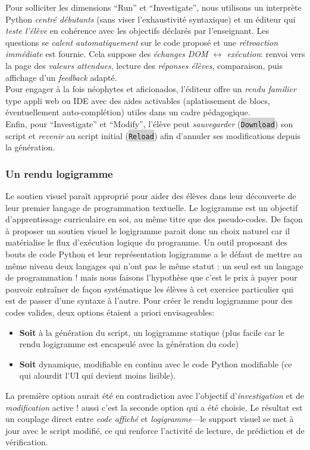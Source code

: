 \documentclass[11pt,a4paper]{article}
\newcommand{\code}[1]{\colorbox{lightgray}{\texttt{\small #1}}}
\begin{document}
Pour solliciter les dimensions ``Run'' et ``Investigate'', nous utilisons un interprète Python \emph{centré débutants} (sans viser l’exhaustivité syntaxique) et un éditeur qui \emph{teste l’élève} en cohérence avec les objectifs déclarés par l’enseignant. Les questions se \emph{calent automatiquement} sur le code proposé et une \emph{rétroaction immédiate} est fournie. Cela suppose des \emph{échanges DOM $\leftrightarrow$ exécution}: renvoi vers la page des \emph{valeurs attendues}, lecture des \emph{réponses élèves}, comparaison, puis affichage d’un \emph{feedback} adapté.
\\
Pour engager à la fois néophytes et aficionados, l’éditeur offre un \emph{rendu familier} type appli web ou IDE avec des aides activables (aplatissement de blocs, éventuellement auto-complétion) utiles dans un cadre pédagogique.\\ Enfin, pour ``Investigate'' et ``Modify'', l’élève peut \emph{sauvegarder} (\code{Download}) son script et \emph{revenir} au script initial (\code{Reload}) afin d’annuler ses modifications depuis la génération.

        
\subsubsection{Un rendu logigramme}
Le soutien visuel paraît approprié pour aider des élèves dans leur découverte de leur premier langage de programmation textuelle. Le logigramme est un objectif d'apprentissage curriculaire en soi, au même titre que des pseudo-codes. De façon à proposer un soutien visuel le logigramme parait donc un choix naturel car il matérialise le flux d'exécution logique du programme. Un outil proposant des bouts de code Python et leur représentation logigramme a le défaut de mettre au même niveau deux langages qui n'ont pas le même statut : un seul est un langage de programmation ! mais nous faisons l'hypothèse que c'est le prix à payer pour pouvoir entraîner de façon systématique les élèves à cet exercice particulier qui est de passer d'une syntaxe à l'autre.
Pour créer le rendu logigramme pour des codes valides, deux options étaient a priori envisageables:\begin{itemize}
    \item \textbf{Soit} à la génération du script, un logigramme statique (plus facile car le rendu logigramme est encapsulé avec la génération du code)
    \item \textbf{Soit} dynamique, modifiable en continu avec le code Python modifiable (ce qui alourdit l'UI qui devient moins lisible).
    \end{itemize}
La première option aurait été en contradiction avec l’objectif d’\emph{investigation} et de \emph{modification} active ! aussi c'est la seconde option qui a été choisie. Le résultat est un couplage direct entre \emph{code affiché} et \emph{logigramme}—le support visuel se met à jour avec le script modifié, ce qui renforce l’activité de lecture, de prédiction et de vérification.
\end{document}
